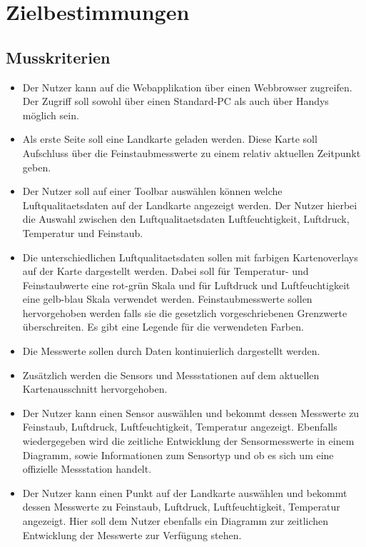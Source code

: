 \section{Zielbestimmungen}
\subsection{Musskriterien}
 \begin{itemize}
	\item Der Nutzer kann auf die Webapplikation über einen Webbrowser zugreifen. Der Zugriff soll sowohl über einen \gls{Standard-PC} als auch über Handys möglich sein.
	\item Als erste Seite soll eine Landkarte geladen werden. Diese Karte soll Aufschluss über die \gls{Feinstaub}messwerte zu einem relativ aktuellen Zeitpunkt geben.
	\item Der Nutzer soll auf einer \gls{Toolbar} auswählen können welche \gls{Luftqualitaetsdaten} auf der Landkarte angezeigt werden. Der Nutzer hierbei die Auswahl zwischen den \gls{Luftqualitaetsdaten} Luftfeuchtigkeit, Luftdruck, Temperatur und \gls{Feinstaub}.
	\item Die unterschiedlichen \gls{Luftqualitaetsdaten} sollen mit farbigen \glspl{Kartenoverlay} auf der Karte dargestellt werden. Dabei soll für Temperatur- und \gls{Feinstaub}werte eine rot-grün Skala und für Luftdruck und Luftfeuchtigkeit eine gelb-blau Skala verwendet werden. \gls{Feinstaub}messwerte sollen hervorgehoben werden falls sie die gesetzlich vorgeschriebenen Grenzwerte überschreiten. Es gibt eine Legende für die verwendeten Farben. 
	\item Die Messwerte sollen durch  Daten kontinuierlich dargestellt werden.
	\item Zusätzlich werden die \glspl{Sensor} und Messstationen auf dem aktuellen Kartenausschnitt hervorgehoben.
	\item Der Nutzer kann einen \gls{Sensor} auswählen und bekommt dessen Messwerte zu \gls{Feinstaub}, Luftdruck, Luftfeuchtigkeit, Temperatur angezeigt. Ebenfalls wiedergegeben wird die zeitliche Entwicklung der \gls{Sensor}messwerte in einem Diagramm, sowie Informationen zum Sensortyp und ob es sich um eine offizielle Messstation handelt.
	\item Der Nutzer kann einen Punkt auf der Landkarte auswählen und bekommt dessen  Messwerte zu \gls{Feinstaub}, Luftdruck, Luftfeuchtigkeit, Temperatur angezeigt. Hier soll dem Nutzer ebenfalls ein Diagramm zur zeitlichen Entwicklung der  Messwerte zur Verfügung stehen.

\end{itemize}
